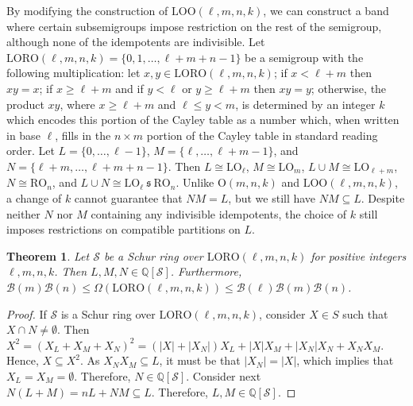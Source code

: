 \documentclass{article}
\theoremstyle{plain}
\newtheorem{Thm}{Theorem}[section]
\theoremstyle{definition}
\renewcommand{\S}{\mathcal{S}}
\newcommand{\Q}{\mathbb{Q}}
\newcommand{\QS}{\Q[\S]}
\newcommand{\B}{\mathscr{B}}
\renewcommand{\O}{\mathrm{O}}
\newcommand{\LO}{\mathrm{LO}}
\newcommand{\RO}{\mathrm{RO}}
\newcommand{\LOO}{\mathrm{LOO}}
\newcommand{\LORO}{\mathrm{LORO}}
\newcommand{\s}{\ \mathfrak{s}\ }
\begin{document}
By modifying the construction of $\LOO(\ell,m,n,k)$, we can construct a band where certain subsemigroups impose restriction on the rest of the semigroup, although none of the idempotents are indivisible. Let \label{loro}$\LORO(\ell,m,n,k) = \{0,1,\ldots, \ell+m+n-1\}$ be a semigroup with the following multiplication: let $x,y\in \LORO(\ell, m,n,k)$; if $x<\ell+m$ then $xy=x$; if $x\ge \ell + m$ and if $y<\ell$ or $y\ge \ell + m$ then $xy=y$; otherwise, the product $xy$, where $x\ge \ell +m$ and $\ell \le y <m$, is determined by an integer $k$ which encodes this portion of the Cayley table as a number which, when written in base $\ell$, fills in the $n\times m$ portion of the Cayley table in standard reading order. Let $L=\{0,\ldots, \ell-1\}$, $M=\{\ell, \ldots, \ell+m-1\}$, and $N=\{\ell+m,\ldots, \ell+m+n-1\}$. Then $L\cong \LO_\ell$, $M\cong \LO_m$, $L\cup M\cong \LO_{\ell+m}$, $N \cong \RO_n$, and $L\cup N\cong \LO_{\ell}\s \RO_n$. Unlike $\O(m,n,k)$ and $\LOO(\ell,m,n,k)$, a change of $k$ cannot guarantee that $NM=L$, but we still have $NM\subseteq L$. Despite neither $N$ nor $M$ containing any indivisible idempotents, the choice of $k$ still imposes restrictions on compatible partitions on $L$. 

\begin{Thm}\label{thm:loroschur} Let $\S$ be a Schur ring over $\LORO(\ell,m,n,k)$ for positive integers $\ell,m,n,k$. Then $L,M,N\in \QS$. Furthermore, $\B(m)\B(n) \le \Omega(\LORO(\ell,m,n,k))\le \B(\ell)\B(m)\B(n)$.
\end{Thm}
\begin{proof}
    If $\S$ is a Schur ring over $\LORO(\ell,m,n,k)$, consider $X\in S$ such that $X\cap N\neq \emptyset$. Then $X^2 = (X_L+X_M+X_N)^2 = (|X|+|X_N|)X_L+|X|X_M + |X_N|X_N + X_NX_M$. Hence, $X\subseteq X^2$. As $X_NX_M\subseteq L$, it must be that $|X_N|=|X|$, which implies that $X_L=X_M=\emptyset$. Therefore, $N\in \QS$. Consider next $N(L+M) = nL + NM\subseteq L$. Therefore, $L, M\in \QS$. 
\end{proof}
\end{document}
